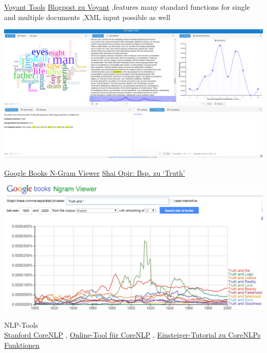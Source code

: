 \documentclass[10pt,a4paper]{article}
\begin{document}
\begin{multicols}{3}
\begin{textbox}{\href{https://voyant-tools.org/}{Voyant Tools}}
\href{https://blogs.reed.edu/ed-tech/2017/03/text-analysis-using-voyant-tools/}{Blogpost zu Voyant} \sep features many standard functions for single and multiple documents \sep XML input possible as well

\includegraphics[width=\textwidth]{voyant.png}
\end{textbox}



\begin{textbox}{\href{https://books.google.com/ngrams}{Google Books N-Gram Viewer}}
\href{https://firstmonday.org/ojs/index.php/fm/article/view/5567/5535}{Shai Opir: Bsp. zu `Truth'}

\includegraphics[width=\textwidth]{googlengramstruth.png}
\end{textbox}

\begin{textbox}{NLP-Tools}
 \\
\href{https://stanfordnlp.github.io/CoreNLP/tutorials.html}{Stanford CoreNLP} \sep 
\href{https://corenlp.run/}{Online-Tool für CoreNLP} \sep 
\href{https://interviewbubble.com/getting-started-with-stanford-corenlp/}{Einsteiger-Tutorial zu CoreNLPs Funktionen}


\end{textbox}
\end{multicols}
\end{document}
